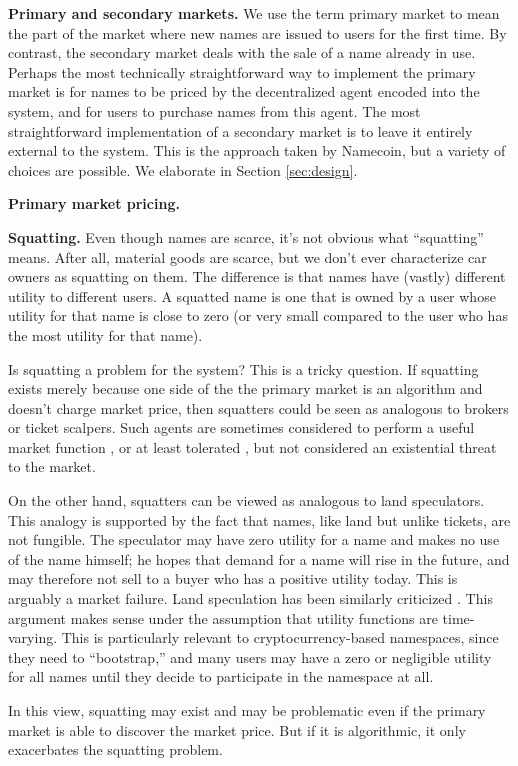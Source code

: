 {\bf Primary and secondary markets.} We use the term primary market to mean the part of the market where new names are issued to users for the first time. By contrast, the secondary market deals with the sale of a name already in use. Perhaps the most technically straightforward way to implement the primary market is for names to be priced by the decentralized agent encoded into the system, and for users to purchase names from this agent. The most straightforward implementation of a secondary market is to leave it entirely external to the system. This is the approach taken by Namecoin, but a variety of choices are possible. We elaborate in Section \ref{sec:design}.

{\bf Primary market pricing.} 

{\bf Squatting.} Even though names are scarce, it's not obvious what ``squatting'' means. After all, material goods are scarce, but we don't ever characterize car owners as squatting on them. The difference is that names have (vastly) different utility to different users. A squatted name is one that is owned by a user whose utility for that name is close to zero (or very small compared to the user who has the most utility for that name).

Is squatting a problem for the system? This is a tricky question. If squatting exists merely because one side of the the primary market is an algorithm and doesn’t charge market price, then squatters could be seen as analogous to brokers or ticket scalpers. Such agents are sometimes considered to perform a useful market function \cite{}, or at least tolerated \cite{}, but not considered an existential threat to the market.

On the other hand, squatters can be viewed as analogous to land speculators. This analogy is supported by the fact that names, like land but unlike tickets, are not fungible. The speculator may have zero utility for a name and makes no use of the name himself; he hopes that demand for a name will rise in the future, and may therefore not sell to a buyer who has a positive utility today. This is arguably a market failure. Land speculation has been similarly criticized \cite{archer73}. This argument makes sense under the assumption that utility functions are time-varying. This is particularly relevant to cryptocurrency-based namespaces, since they need to ``bootstrap,'' \hi{[explain]} and many users may have a zero or negligible utility for all names until they decide to participate in the namespace at all.

In this view, squatting may exist and may be problematic even if the primary market is able to discover the market price. But if it is algorithmic, it only exacerbates the squatting problem.


